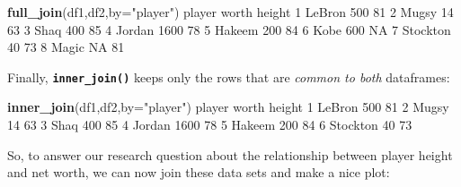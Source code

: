 \documentclass[
]{book}
\newenvironment{Shaded}{\begin{snugshade}}{\end{snugshade}}
\newcommand{\DataTypeTok}[1]{\textcolor[rgb]{0.13,0.29,0.53}{#1}}
\newcommand{\DecValTok}[1]{\textcolor[rgb]{0.00,0.00,0.81}{#1}}
\newcommand{\KeywordTok}[1]{\textcolor[rgb]{0.13,0.29,0.53}{\textbf{#1}}}
\newcommand{\NormalTok}[1]{#1}
\newcommand{\OperatorTok}[1]{\textcolor[rgb]{0.81,0.36,0.00}{\textbf{#1}}}
\newcommand{\OtherTok}[1]{\textcolor[rgb]{0.56,0.35,0.01}{#1}}
\newcommand{\StringTok}[1]{\textcolor[rgb]{0.31,0.60,0.02}{#1}}
\begin{document}
\begin{Shaded}
\begin{Highlighting}[]
\KeywordTok{full_join}\NormalTok{(df1,df2,}\DataTypeTok{by=}\StringTok{"player"}\NormalTok{)}
\NormalTok{    player worth height}
\DecValTok{1}\NormalTok{   LeBron   }\DecValTok{500}     \DecValTok{81}
\DecValTok{2}\NormalTok{    Mugsy    }\DecValTok{14}     \DecValTok{63}
\DecValTok{3}\NormalTok{     Shaq   }\DecValTok{400}     \DecValTok{85}
\DecValTok{4}\NormalTok{   Jordan  }\DecValTok{1600}     \DecValTok{78}
\DecValTok{5}\NormalTok{   Hakeem   }\DecValTok{200}     \DecValTok{84}
\DecValTok{6}\NormalTok{     Kobe   }\DecValTok{600}     \OtherTok{NA}
\DecValTok{7}\NormalTok{ Stockton    }\DecValTok{40}     \DecValTok{73}
\DecValTok{8}\NormalTok{    Magic    }\OtherTok{NA}     \DecValTok{81}
\end{Highlighting}
\end{Shaded}

Finally, \textbf{\texttt{inner\_join()}} keeps only the rows that are \emph{common to both} dataframes:

\begin{Shaded}
\begin{Highlighting}[]
\KeywordTok{inner_join}\NormalTok{(df1,df2,}\DataTypeTok{by=}\StringTok{"player"}\NormalTok{)}
\NormalTok{    player worth height}
\DecValTok{1}\NormalTok{   LeBron   }\DecValTok{500}     \DecValTok{81}
\DecValTok{2}\NormalTok{    Mugsy    }\DecValTok{14}     \DecValTok{63}
\DecValTok{3}\NormalTok{     Shaq   }\DecValTok{400}     \DecValTok{85}
\DecValTok{4}\NormalTok{   Jordan  }\DecValTok{1600}     \DecValTok{78}
\DecValTok{5}\NormalTok{   Hakeem   }\DecValTok{200}     \DecValTok{84}
\DecValTok{6}\NormalTok{ Stockton    }\DecValTok{40}     \DecValTok{73}
\end{Highlighting}
\end{Shaded}

So, to answer our research question about the relationship between player height and net worth, we can now join these data sets and make a nice plot:

\begin{Shaded}
\end{Shaded}
\end{document}
